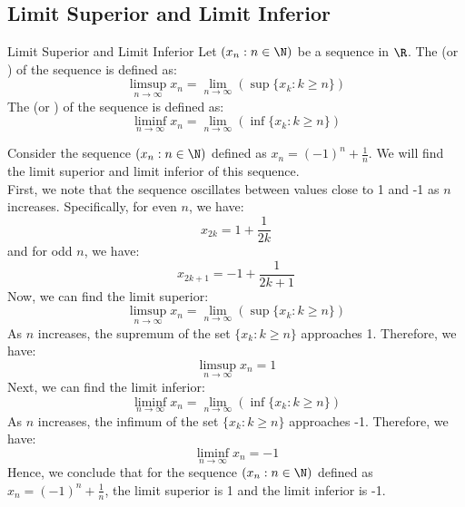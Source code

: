 \documentclass[openany]{book}
\begin{document}
\subsection{Limit Superior and Limit Inferior}
\begin{mydefinition}{Limit Superior and Limit Inferior}
    Let $(x_n : n \in \N)$ be a sequence in $\R$. The  (or ) of the sequence is defined as:
    $$\limsup_{n \to \infty} x_n = \lim_{n \to \infty} (\sup\{x_k : k \geq n\})$$
    The  (or ) of the sequence is defined as:
    $$\liminf_{n \to \infty} x_n = \lim_{n \to \infty} (\inf\{x_k : k \geq n\})$$
\end{mydefinition}
\begin{example}
    Consider the sequence $(x_n : n \in \N)$ defined as $x_n = (-1)^n + \frac{1}{n}$. We will find the limit superior and limit inferior of this sequence. \\
    First, we note that the sequence oscillates between values close to 1 and -1 as $n$ increases. Specifically, for even $n$, we have:
    $$x_{2k} = 1 + \frac{1}{2k}$$
    and for odd $n$, we have:
    $$x_{2k+1} = -1 + \frac{1}{2k+1}$$
    Now, we can find the limit superior:
    $$\limsup_{n \to \infty} x_n = \lim_{n \to \infty} (\sup\{x_k : k \geq n\})$$
    As $n$ increases, the supremum of the set $\{x_k : k \geq n\}$ approaches 1. Therefore, we have:
    $$\limsup_{n \to \infty} x_n = 1$$
    Next, we can find the limit inferior:
    $$\liminf_{n \to \infty} x_n = \lim_{n \to \infty} (\inf\{x_k : k \geq n\})$$
    As $n$ increases, the infimum of the set $\{x_k : k \geq n\}$ approaches -1. Therefore, we have:
    $$\liminf_{n \to \infty} x_n = -1$$
    Hence, we conclude that for the sequence $(x_n : n \in \N)$ defined as $x_n = (-1)^n + \frac{1}{n}$, the limit superior is 1 and the limit inferior is -1.
\end{example}
\end{document}
